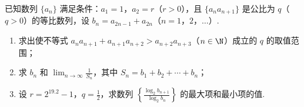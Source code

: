 \begin{problem}
已知数列 \(\{a_n\}\) 满足条件：\(a_1 = 1\)，\(a_2 = r\)（\(r > 0\)），且 \(\{a_n a_{n + 1}\}\) 是公比为 \(q\)（\(q > 0\)）的等比数列，设 \(b_n = a_{2n - 1} + a_{2n}\)（\(n = 1\)，\(2\)，\(\dots\)）.

\begin{enumerate}
\item 求出使不等式 \(a_na_{n + 1} + a_{n + 1}a_{n + 2} > a_{n + 2}a_{n + 3}\)（\(n \in \N\)）成立的 \(q\) 的取值范围；
\item 求 \(b_n\) 和 \(\displaystyle\lim_{n \to \infty}\frac{1}{S_n}\)，其中 \(S_n = b_1 + b_2 + \cdots + b_n\)；
\item 设 \(r = 2^{19.2} - 1\)，\(q = \frac{1}{2}\)，求数列 \(\left\{\frac{\log_2 b_{n + 1}}{\log_2 b_n}\right\}\) 的最大项和最小项的值.
\end{enumerate}
\end{problem}

